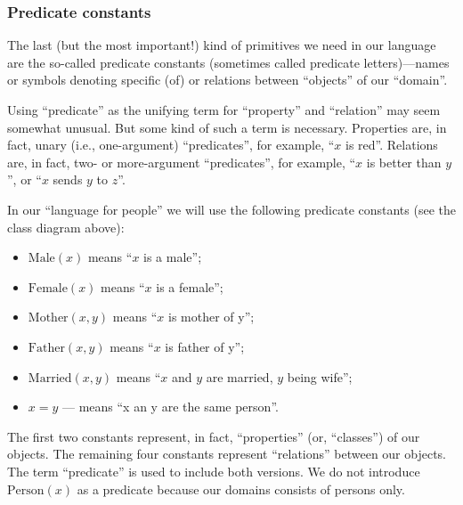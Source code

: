 \subsubsection*{Predicate constants}

The last (but the most important!) kind of primitives we need in our language are the so-called predicate constants (sometimes called predicate letters)---names or symbols denoting specific  (of) or relations between ``objects'' of our ``domain''.

\begin{note}
Using ``predicate'' as the unifying term for ``property'' and ``relation'' may seem somewhat unusual.
But some kind of such a term is necessary.
Properties are, in fact, unary (i.e., one-argument) ``predicates'', for example, ``\(x\) is red''.
Relations are, in fact, two- or more-argument ``predicates'', for example, ``\(x\) is better than \(y\)'', or ``\(x\) sends \(y\) to \(z\)''.
\end{note}

\begin{example}
In our ``language for people'' we will use the following predicate constants (see the class diagram above):
\begin{itemize}
    \item \(\mathrm{Male}(x)\) means ``\(x\) is a male'';
    \item \(\mathrm{Female}(x)\) means ``\(x\) is a female'';
    \item \(\mathrm{Mother}(x, y)\) means ``\(x\) is mother of y'';
    \item \(\mathrm{Father}(x, y)\) means ``\(x\) is father of y'';
    \item \(\mathrm{Married}(x, y)\) means ``\(x\) and \(y\) are married, \(y\) being wife'';
    \item \(x=y\) --- means ``x an y are the same person''.
\end{itemize}

The first two constants represent, in fact, ``properties'' (or, ``classes'') of our objects.
The remaining four constants represent ``relations'' between our objects.
The term ``predicate'' is used to include both versions.
We do not introduce \(\mathrm{Person}(x)\) as a predicate because our domains consists of persons only.
\end{example}

